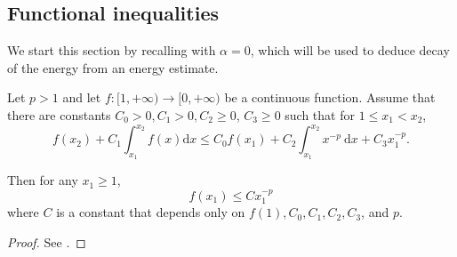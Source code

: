 \documentclass[reqno]{amsart}
\numberwithin{equation}{section}
\theoremstyle{plain}
\theoremstyle{definition}
\theoremstyle{remark}
\numberwithin{equation}{section}
\begin{document}
\subsection{Functional inequalities}

We start this section by recalling \cite[Lemma 3.4]{scalarMZ} with $\alpha=0$, which will be used to deduce decay of the energy from an energy estimate.
\begin{lem}\label{lem:decay}
    Let $p>1$ and let $f:[1,+\infty) \rightarrow[0,+\infty)$ be a continuous function. Assume that there are constants $C_0>0, C_1>0, C_2 \geq 0$, $C_3 \geq 0$ such that for $1 \leq x_1<x_2$,
$$
f(x_2)+C_1 \int_{x_1}^{x_2}  f(x) \mathrm{d} x \leq C_0 f(x_1)+C_2 \int_{x_1}^{x_2} x^{-p} \mathrm{~d} x+C_3 x_1^{-p} .
$$

Then for any $x_1 \geq 1$,
$$
f(x_1) \leq C x_1^{-p}
$$
where $C$ is a constant that depends only on $f(1), C_0, C_1, C_2, C_3$, and $p$.
\end{lem}
\begin{proof}
    See \cite[Lemma 3.4]{scalarMZ}.
\end{proof}
\end{document}

